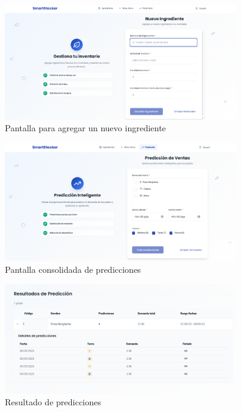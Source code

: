\begin{figure}[htbp]
    \centering
    \includegraphics[width=0.9\textwidth]{images/nuevoIngrediente.png}
    \caption{Pantalla para agregar un nuevo ingrediente}
    \label{fig:ux-nuevo-ingrediente}
\end{figure}

\begin{figure}[htbp]
    \centering
    \includegraphics[width=0.9\textwidth]{images/predicciones.png}
    \caption{Pantalla consolidada de predicciones}
    \label{fig:ux-predicciones}
\end{figure}

\begin{figure}[htbp]
    \centering
    \includegraphics[width=0.9\textwidth]{images/prediccion1.png}
    \caption{Resultado de predicciones}
    \label{fig:ux-prediccion1}
\end{figure}

